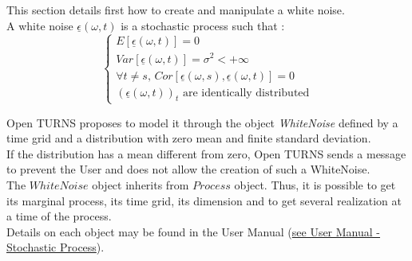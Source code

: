 \renewcommand{\filename}{docUC_StochProc_WhiteNoise.tex}
\renewcommand{\filetitle}{UC : Manipulation of a White Noise}

 \HeaderIILevel





This section details first how to create and manipulate a white noise.\\

A white noise $\underline{\epsilon}(\omega,t)$ is a stochastic process such that :
\begin{equation} \label{whiteNoiseDef}
\left\{
\begin{array}{l} 
  E[\underline{\epsilon}(\omega,t)]  = 0 \\
  Var[\underline{\epsilon}(\omega,t)]  = \sigma^2 < +\infty \\
 \forall  t \neq s , \, Cor[\underline{\epsilon}(\omega,s), \underline{\epsilon}(\omega,t)] = 0 \\
 (\underline{\epsilon}(\omega,t))_t \mbox{ are identically distributed}
\end{array} 
\right.
\end{equation}


Open TURNS proposes to model it through the object  \emph{WhiteNoise} defined by a time grid and a distribution with zero mean and finite standard deviation.\\

If the distribution has a mean different from zero, Open TURNS sends a message to prevent the User and does not allow the creation of such a WhiteNoise.\\
The $WhiteNoise$ object inherits from $Process$ object.
Thus, it is possible to get its marginal process, its time grid, its dimension and to get several realization at a time of the process.\\

Details on each object may be found in the User Manual  (\href{OpenTURNS_UserManual_TUI.pdf}{see User Manual - Stochastic Process}).\\

